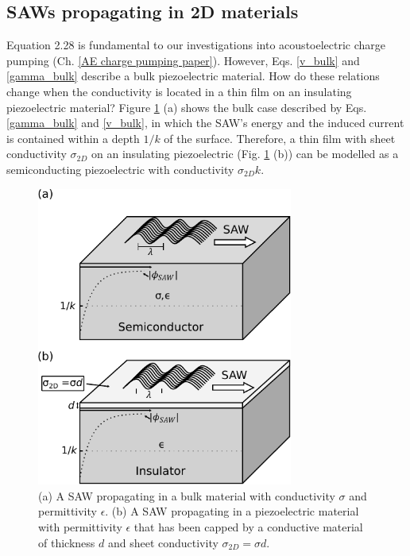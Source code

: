 \documentclass[double,12pt,1in]{beavtex}
\begin{document}
\subsection{SAWs propagating in 2D materials} \label{SAW theory, propagating in 2D materials}

Equation 2.28 is fundamental to our investigations into acoustoelectric charge pumping
(Ch. \ref{AE charge pumping paper}). However, Eqs. \ref{v_bulk} and \ref{gamma_bulk} describe a bulk piezoelectric material. How do these relations change when the conductivity is located in a thin film on an insulating piezoelectric material? Figure \ref{SAW in thin film} (a) shows the bulk case described by Eqs. \ref{gamma_bulk} and \ref{v_bulk}, in which the SAW's energy and the induced current is contained within a depth $1/k$ of the surface. Therefore, a thin film with sheet conductivity $\sigma_{2D}$ on an insulating piezoelectric (Fig. \ref{SAW in thin film} (b)) can be modelled as a semiconducting piezoelectric with conductivity $\sigma_{2D}k$.

\begin{figure}
    \includegraphics[width = 0.75\textwidth]{SAW in thin film.pdf}
    \caption{(a) A SAW propagating in a bulk material with conductivity $\sigma$ and permittivity $\epsilon$. (b) A SAW propagating in a piezoelectric material with permittivity $\epsilon$ that has been capped by a conductive material of thickness $d$ and sheet conductivity $\sigma_{2D} = \sigma d$.}
    \label{SAW in thin film}
\end{figure}
\end{document}
